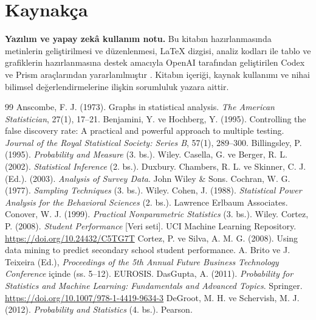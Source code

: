 \chapter*{Kaynakça}

\noindent\textbf{Yazılım ve yapay zekâ kullanım notu.}
Bu kitabın hazırlanmasında metinlerin geliştirilmesi ve düzenlenmesi,
\LaTeX{} dizgisi, analiz kodları ile tablo ve grafiklerin hazırlanmasına
destek amacıyla OpenAI tarafından geliştirilen Codex ve Prism araçlarından
yararlanılmıştır \cite{openai2026codex,openai2026prism}.
Kitabın içeriği, kaynak kullanımı ve nihai bilimsel değerlendirmelerine
ilişkin sorumluluk yazara aittir.

\begin{thebibliography}{99}
\setlength{\itemsep}{0.35em}
\small
{} Anscombe, F. J. (1973). Graphs in statistical analysis. \textit{The American Statistician}, 27(1), 17--21.
 Benjamini, Y. ve Hochberg, Y. (1995). Controlling the false discovery rate: A practical and powerful approach to multiple testing. \textit{Journal of the Royal Statistical Society: Series B}, 57(1), 289--300.
 Billingsley, P. (1995). \textit{Probability and Measure} (3. bs.). Wiley.
 Casella, G. ve Berger, R. L. (2002). \textit{Statistical Inference} (2. bs.). Duxbury.
 Chambers, R. L. ve Skinner, C. J. (Ed.). (2003). \textit{Analysis of Survey Data}. John Wiley \& Sons.
 Cochran, W. G. (1977). \textit{Sampling Techniques} (3. bs.). Wiley.
 Cohen, J. (1988). \textit{Statistical Power Analysis for the Behavioral Sciences} (2. bs.). Lawrence Erlbaum Associates.
 Conover, W. J. (1999). \textit{Practical Nonparametric Statistics} (3. bs.). Wiley.
 Cortez, P. (2008). \textit{Student Performance} [Veri seti]. UCI Machine Learning Repository. \url{https://doi.org/10.24432/C5TG7T}
 Cortez, P. ve Silva, A. M. G. (2008). Using data mining to predict secondary school student performance. A. Brito ve J. Teixeira (Ed.), \textit{Proceedings of the 5th Annual Future Business Technology Conference} içinde (ss. 5--12). EUROSIS.
 DasGupta, A. (2011). \textit{Probability for Statistics and Machine Learning: Fundamentals and Advanced Topics}. Springer. \url{https://doi.org/10.1007/978-1-4419-9634-3}
 DeGroot, M. H. ve Schervish, M. J. (2012). \textit{Probability and Statistics} (4. bs.). Pearson.

\end{thebibliography}
